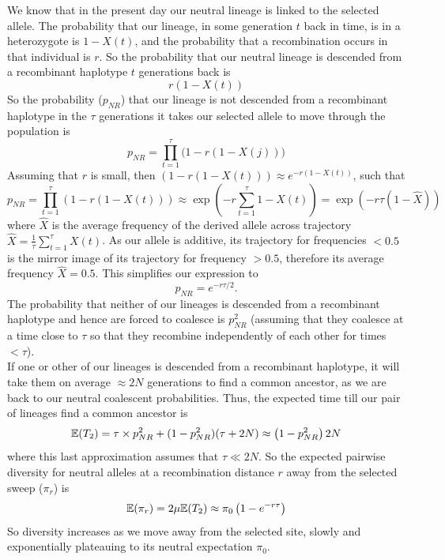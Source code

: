 We know that in the present day our neutral lineage is linked to
the selected allele. The probability that our lineage, in some
generation $t$ back in time, is in a heterozygote is $1-X(t)$, and the
probability that a recombination occurs in that individual is $r$. So
the probability that our neutral lineage is descended from a
recombinant haplotype $t$ generations back is 
\begin{equation}
r (1-X(t))
\end{equation}
So the probability ($p_{NR}$) that our lineage is not descended from a
recombinant haplotype  in the
$\tau$ generations it takes our selected allele to move through the
population is
\begin{equation}
p_{NR}=\prod_{t=1}^{\tau} \big(1- r(1-X(j))\big)
\end{equation}
Assuming that $r$ is small, then $ \left(1- r(1-X(t))\right) \approx
e^{-r(1-X(t))}$,  such that
\begin{equation}
p_{NR}=\prod_{t=1}^{\tau} \left(1- r(1-X(t))\right) \approx \exp
\left( -r\sum_{t=1}^{\tau}
1- X(t) \right) =\exp
\left( -r \tau (1-\widehat{X}) \right)
\end{equation}
where
$\widehat{X}$ is the average frequency of the derived  allele across  trajectory 
$\widehat{X} = \frac{1}{\tau}  \sum_{t=1}^{\tau}
 X(t)$. As our allele is additive, its trajectory for frequencies
 $<0.5$ is the mirror image of its trajectory for frequency $>0.5$, therefore its
average frequency $\widehat{X} =0.5$. This simplifies our expression to
\begin{equation}
p_{NR} = e^{-r \tau/2 }.
\end{equation}
The probability that neither of our lineages is descended from a
recombinant haplotype and hence are forced to coalesce is $p_{NR}^2$ (assuming that
they coalesce at a time close to $\tau$ so that they recombine
independently of each other for times $< \tau$).\\

If one or other of our lineages is descended from a recombinant haplotype, it will take them on average
$\approx 2N$ generations to find a common ancestor, as we are back to our
neutral coalescent probabilities. Thus, the expected time
till our pair of lineages find a common ancestor is
\begin{equation}
\mathbb{E}(T_2)  = \tau \times p_{NR}^2 +(1-p_{NR}^2) (\tau +2N) \approx
\left(1-p_{NR}^2 \right) 2N
\end{equation}
where this last approximation assumes that $\tau \ll 2N$. So the
expected pairwise diversity for neutral alleles at a recombination
distance $r$ away from the selected sweep ($\pi_r$) is
\begin{equation}
\mathbb{E}(\pi_r) = 2\mu \mathbb{E}(T_2)  \approx \pi_0 \left(1-e^{-r\tau} \right) \label{eqn:pi_HH}
\end{equation}
So diversity increases as we move away from the selected site,
slowly and exponentially plateauing to its neutral expectation $\pi_0$.\\

